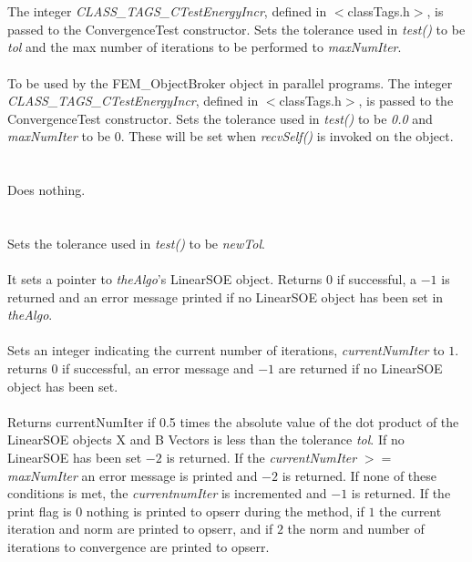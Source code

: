   \\
  \\
The integer {\em CLASS\_TAGS\_CTestEnergyIncr}, defined in
$<$classTags.h$>$, is passed to the ConvergenceTest constructor. Sets
the tolerance used in {\em test()} to be {\em tol} and the max number
of iterations to be performed to {\em maxNumIter}. \\

  \\
To be used by the FEM\_ObjectBroker object in parallel programs. The
integer {\em CLASS\_TAGS\_CTestEnergyIncr}, defined in
$<$classTags.h$>$, is passed to the ConvergenceTest constructor. Sets
the tolerance used in {\em test()} to be {\em 0.0} and {\em maxNumIter} 
to be $0$. These will be set when {\em recvSelf()} is invoked on the object. \\


 \\
 \\ 
Does nothing. \\

  \\
 \\
Sets the tolerance used in {\em test()} to be {\em newTol}. \\

 \\
It sets a pointer to {\em theAlgo}'s LinearSOE object. Returns $0$ if
successful, a $-1$ is returned and an error message printed if no
LinearSOE object has been set in {\em theAlgo}. \\


 \\
Sets an integer indicating the current number of iterations, {\em
currentNumIter} to $1$. returns $0$ if successful, an error message
and $-1$ are returned if no LinearSOE object has been set. \\

 \\
Returns {currentNumIter} if 0.5 times the absolute value of the dot product of
the LinearSOE objects X and B Vectors is less than the tolerance {\em
tol}. If no LinearSOE has been set $-2$ is returned. If the {\em
currentNumIter} $>=$ {\em maxNumIter} an error message is printed and
$-2$ is returned. If none of these conditions is met, the {\em
currentnumIter} is incremented and $-1$ is returned. If the print flag
is $0$ nothing is printed to 
opserr during the method, if $1$ the current iteration and norm are
printed to opserr, and if $2$ the norm and number of iterations to convergence
are printed to opserr. \\ 



